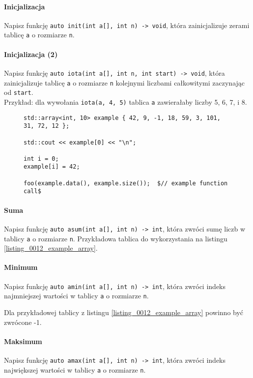 \documentclass[11pt,a4paper,titlepage,onecolumn]{article}
\begin{document}
\paragraph{Inicjalizacja} Napisz funkcję \texttt{auto init(int a[], int n) ->
void}, która zainicjalizuje zerami tablicę \texttt{a} o rozmiarze \texttt{n}.

\paragraph{Inicjalizacja (2)} Napisz funkcję \texttt{auto iota(int a[], int n,
int start) -> void}, która zainicjalizuje tablicę \texttt{a} o rozmiarze
\texttt{n} kolejnymi liczbami całkowitymi zaczynając od \texttt{start}.\\
Przykład: dla wywołania \texttt{iota(a, 4, 5)} tablica \texttt{a} zawierałaby
liczby 5, 6, 7, i 8.

\begin{figure}
{\small
\begin{lstlisting}[caption={przykładowa tablica w stylu C++},
    captionpos=b,
    label=listing_0012_example_array]
std::array<int, 10> example { 42, 9, -1, 18, 59, 3, 101, 31, 72, 12 };

std::cout << example[0] << "\n";

int i = 0;
example[i] = 42;

foo(example.data(), example.size());  $// example function call$
\end{lstlisting}}
\end{figure}

\paragraph{Suma} Napisz funkcję \texttt{auto asum(int a[], int n) -> int}, która
zwróci sumę liczb w tablicy \texttt{a} o rozmiarze \texttt{n}. Przykładowa
tablica do wykorzystania na listingu \ref{listing_0012_example_array}.

\paragraph{Minimum} Napisz funkcję \texttt{auto amin(int a[], int n) ->
int}, która zwróci indeks najmniejszej wartości w tablicy \texttt{a} o rozmiarze
\texttt{n}.

Dla przykładowej tablicy z listingu \ref{listing_0012_example_array} powinno być
zwrócone -1.

\paragraph{Maksimum} Napisz funkcję \texttt{auto amax(int a[], int n) ->
int}, która zwróci indeks największej wartości w tablicy \texttt{a} o rozmiarze
\texttt{n}.
\end{document}
